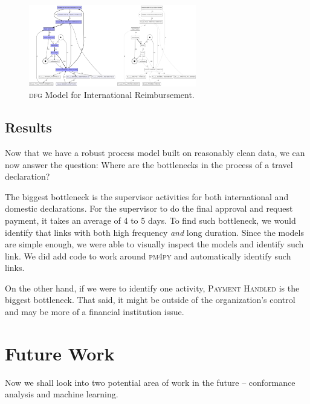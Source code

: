 \documentclass[conference]{IEEEtran}
\begin{document}
\begin{figure}[htbp]
\centerline{\includegraphics[width=0.65\textwidth]{images/international.png}}
\caption{\textsc{dfg} Model for International Reimbursement.}
\label{fig-international}
\end{figure}


\subsection{Results}

Now that we have a robust process model built on reasonably clean data,
we can now answer the question: 
Where are the bottlenecks in the process of a travel declaration?

The biggest bottleneck is the supervisor activities for both international
and domestic declarations.  For the supervisor to do the final approval and
request payment, it takes an average of 4 to 5 days.
To find such bottleneck, we would identify that
links with both high frequency \textit{and} long duration. Since the models
are simple enough, we were able to visually inspect the models and identify
such link. We did add code to work around \textsc{pm4py} and
automatically identify such links.

On the other hand, if we
were to identify one activity, \textsc{Payment Handled}
is the biggest bottleneck. That said,
it might be outside of the organization’s control and may be more of a
financial institution issue.


\section{Future Work}
\label{section-future}

Now we shall look into two potential area of work in the future --
conformance analysis and machine learning.
\end{document}
